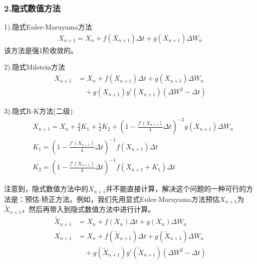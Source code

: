         \subsubsection{2.隐式数值方法}
            \label{subsubsec:2.隐式数值方法}
            \par
            1).隐式Euler-Maruyama方法
            \begin{align*}
            X_{n+1} = X_n + f(X_{n+1}) \Delta t+ g(X_{n+1})\Delta W_n
            \end{align*}
            该方法是强1阶收敛的。
            \par
            2).隐式Milstein方法
            \begin{align*}
            X_{n+1} &= X_n+f(X_{n+1})\Delta t + g(X_{n+1})\Delta W_n\\
             &\quad + g(X_{n+1})g'(X_{n+1})(\Delta W^2 - \Delta t)
            \end{align*}
            \par
            3).隐式R-K方法(二级)
            \begin{align*}
                &X_{n+1} = X_n +\frac 34 K_1+ \frac 14 K_2 + \left( 1-\frac{f'(X_{n+1})}{4} \Delta t \right)^{-2} g(X_{n+1})\Delta W_n\\
                &K_1 = \left( 1-\frac{f'(X_{n+1})}{4} \Delta t \right)^{-1}f(X_{n+1})\Delta t\\
                &K_2 = \left( 1-\frac{f'(X_{n+1})}{4} \Delta t \right)^{-1}f(X_{n+1} + K_1)\Delta t
            \end{align*}
            \par
            注意到，隐式数值方法中的$X_{n+1}$并不能直接计算，解决这个问题的一种可行的方法是：预估-矫正方法。例如，我们先用显式Euler-Maruyama方法预估$X_{n+1}$为
            $\tilde{X}_{n+1}$，然后再带入到隐式数值方法中进行计算。
            \begin{align*}
            \tilde{X}_{n+1} &= X_n+f(X_n)\Delta t +g(X_n)\Delta W_n\\
            X_{n+1} &= X_n+f(\tilde{X}_{n+1})\Delta t + g(\tilde{X}_{n+1})\Delta W_n\\
             & \quad + g(\tilde{X}_{n+1})g'(\tilde{X}_{n+1})(\Delta W^2 - \Delta t)
            \end{align*}
